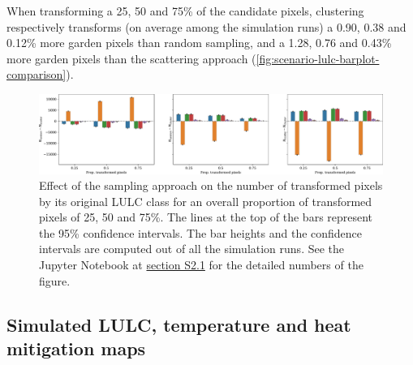 \documentclass[10pt,letterpaper]{article}
\begin{document}
When transforming a 25, 50 and 75\% of the candidate pixels, clustering respectively transforms (on average among the simulation runs) a 0.90, 0.38 and 0.12\% more garden pixels than random sampling, and a 1.28, 0.76 and 0.43\% more garden pixels than the scattering approach (\autoref{fig:scenario-lulc-barplot-comparison}). 
\begin{figure}
  \begin{adjustwidth}{-.4\textwidth}{0cm}  
    \centering
    \includegraphics[width=\linewidth]{figures/scenario-lulc-barplot-comparison}
    \caption{\label{fig:scenario-lulc-barplot-comparison} Effect of the sampling approach on the number of transformed pixels by its original LULC class for an overall proportion of transformed pixels of 25, 50 and 75\%. The lines at the top of the bars represent the 95\% confidence intervals. The bar heights and the confidence intervals are computed out of all the simulation runs. See the Jupyter Notebook at \hyperref[sec:si-scenarios]{section S2.1} for the detailed numbers of the figure.}
  \end{adjustwidth}
\end{figure}



\subsection*{Simulated LULC, temperature and heat mitigation maps}
\end{document}
